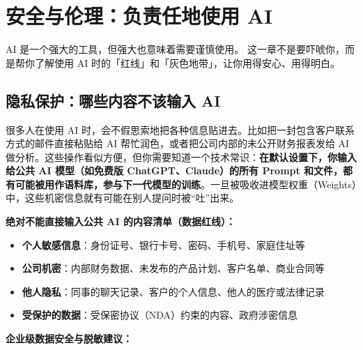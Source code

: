 % 
% 


\chapter{安全与伦理：负责任地使用 AI}
\label{ch:safety-ethics}

AI 是一个强大的工具，但强大也意味着需要谨慎使用。
这一章不是要吓唬你，而是帮你了解使用 AI 时的「红线」和「灰色地带」，让你用得安心、用得明白。

\section{隐私保护：哪些内容不该输入 AI}

很多人在使用 AI 时，会不假思索地把各种信息贴进去。比如把一封包含客户联系方式的邮件直接粘贴给 AI 帮忙润色，或者把公司内部的未公开财务报表发给 AI 做分析。这些操作看似方便，但你需要知道一个技术常识：\textbf{在默认设置下，你输入给公共 AI 模型（如免费版 ChatGPT、Claude）的所有 Prompt 和文件，都有可能被用作语料库，参与下一代模型的训练}。一旦被吸收进模型权重（Weights）中，这些机密信息就有可能在别人提问时被“吐”出来。

\textbf{绝对不能直接输入公共 AI 的内容清单（数据红线）：}

\begin{itemize}
  \item \textbf{个人敏感信息}：身份证号、银行卡号、密码、手机号、家庭住址等
  \item \textbf{公司机密}：内部财务数据、未发布的产品计划、客户名单、商业合同等
  \item \textbf{他人隐私}：同事的聊天记录、客户的个人信息、他人的医疗或法律记录
  \item \textbf{受保护的数据}：受保密协议（NDA）约束的内容、政府涉密信息
\end{itemize}

\textbf{企业级数据安全与脱敏建议：}

